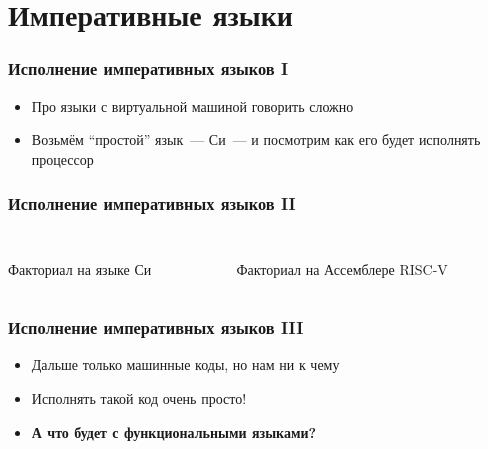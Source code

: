 \documentclass[aspectratio=169]{beamer}
\begin{document}
\section{Императивные языки}

\begin{frame}
    \frametitle{Исполнение императивных языков I}
    \begin{itemize}
        \item Про языки с виртуальной машиной говорить сложно
        \item Возьмём \enquote{простой} язык~--- Си~--- и посмотрим как его будет исполнять процессор
    \end{itemize}

\end{frame}

\begin{frame}[fragile]
    \frametitle{Исполнение императивных языков II}
    \begin{columns}
        \begin{column}{0.5\linewidth}
            \begin{listing}[H]
                \inputminted[firstline=3, fontsize=\footnotesize]{c}{figures/fac.c}
                \caption{Факториал на языке Си}
            \end{listing}
        \end{column}
        \begin{column}{0.5\linewidth}
            \begin{listing}[H]
                \inputminted[fontsize=\scriptsize]{asm}{figures/fac.S}
                \caption{Факториал на Ассемблере RISC-V}
            \end{listing}
        \end{column}
    \end{columns}
\end{frame}

\begin{frame}
    \frametitle{Исполнение императивных языков III}
    \begin{itemize}
        \item Дальше только машинные коды, но нам ни к чему
        \item<+-> Исполнять такой код очень просто!
        \item<+-| alert@+> \textbf{А что будет с функциональными языками?}
    \end{itemize}
\end{frame}
\end{document}
